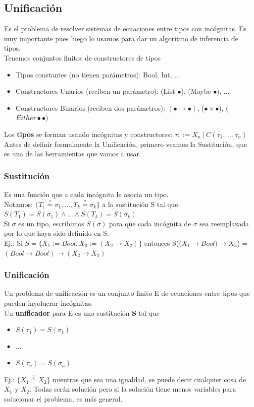 \documentclass[10pt,a4paper]{article}
\begin{document}
\subsection*{Unificación}
Es el problema de resolver sistemas de ecuaciones entre tipos con incógnitas. Es muy importante pues luego lo usamos para dar un algoritmo de inferencia de tipos. \\
Tenemos conjuntos finitos de constructores de tipos 
\begin{itemize}
    \item Tipos constantes (no tienen parámetros): Bool, Int, ...
    \item Constructores Unarios (reciben un parámetro): (List $\bullet$), (Maybe $\bullet$), ...
    \item Constructores Binarios (reciben dos parámetros): $(\bullet \rightarrow \bullet)$, ($\bullet \times \bullet$), ($Either \bullet \bullet$)
\end{itemize}
Los \textbf{tipos} se forman usando incógnitas y constructores: $\tau ::= X_{n} \ | \ C(\tau_{1}, \dots, \tau_{n})$ \\
Antes de definir formalmente la Unificación, primero veamos la Sustitución, que es una de las herramientas que vamos a usar.
\subsubsection*{Sustitución}
Es una función que a cada incógnita le asocia un tipo. \\
Notamos: $\{T_{1} \stackrel{?}{=} \sigma_{1}, \dots, T_{k}\stackrel{?}{=}\sigma_{k}\}$ a la sustitución S tal que $S(T_{1}) = S(\sigma_{1}) \land \dots \land S(T_{k}) = S(\sigma_{k})$ \\
Si $\sigma$ es un tipo, escribimos $S(\sigma)$ para que cada incógnita de $\sigma$ sea reemplazada por lo que haya sido definido en S. \\

Ej.: Si $S = \{X_{1} := Bool, X_{3} := (X_{2} \rightarrow X_{2})\}$ entonces S(($X_{1} \rightarrow Bool) \rightarrow X_{3}$) = $(Bool \rightarrow Bool) \rightarrow (X_{2} \rightarrow X_{2})$ 
\subsubsection*{Unificación}
Un problema de unificación es un conjunto finito E de ecuaciones entre tipos que pueden involucrar incógnitas. \\
Un \textbf{unificador} para E es una sustitución \textbf{S} tal que 
\begin{itemize}
    \item $S(\tau_{1}) = S(\sigma_{1})$
    \item ... 
    \item $S(\tau_{n}) = S(\sigma_{n})$
\end{itemize}
Ej.: $\{X_{1} \stackrel{?}{=} X_{2}\}$ mientras que sea una igualdad, se puede decir cualquier cosa de $X_{1}$ y $X_{2}$. Todas serán solución pero si la solución tiene menos variables para solucionar el problema, es más general. 
\end{document}
